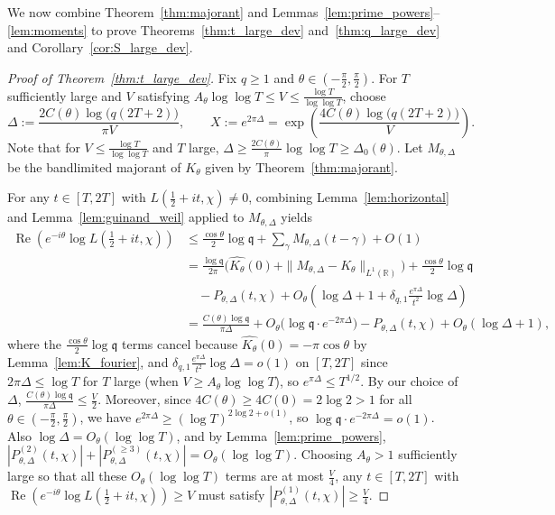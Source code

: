 \documentclass[11pt,a4paper]{amsart}
\theoremstyle{remark}
\numberwithin{equation}{section}
\newcommand{\R}{\mathbb{R}}
\newcommand{\q}{\mathfrak{q}}
\begin{document}
We now combine Theorem~\ref{thm:majorant} and Lemmas~\ref{lem:prime_powers}--\ref{lem:moments} to prove Theorems~\ref{thm:t_large_dev} and~\ref{thm:q_large_dev} and Corollary~\ref{cor:S_large_dev}.

\begin{proof}[Proof of Theorem~\ref{thm:t_large_dev}]
Fix $q \ge 1$ and $\theta \in (-\frac{\pi}{2},\frac{\pi}{2})$. For $T$ sufficiently large and $V$ satisfying $A_\theta\log\log T \le V \le \frac{\log T}{\log\log T}$, choose
\[
  \Delta := \frac{2C(\theta)\log\bigl(q(2T+2)\bigr)}{\pi V},
  \qquad
  X := e^{2\pi\Delta} = \exp\!\left(\frac{4C(\theta)\log\bigl(q(2T+2)\bigr)}{V}\right).
\]
Note that for $V \le \frac{\log T}{\log\log T}$ and $T$ large, $\Delta \ge \frac{2C(\theta)}{\pi}\log\log T \ge \Delta_0(\theta)$. Let $M_{\theta,\Delta}$ be the bandlimited majorant of $K_\theta$ given by Theorem~\ref{thm:majorant}.

For any $t \in [T,2T]$ with $L(\frac{1}{2}+it,\chi) \neq 0$, combining Lemma~\ref{lem:horizontal} and Lemma~\ref{lem:guinand_weil} applied to $M_{\theta,\Delta}$ yields
\begin{align*}
  \operatorname{Re}\!\left(e^{-i\theta}\log L(\tfrac{1}{2}+it,\chi)\right)
  &\le \frac{\cos\theta}{2}\log\q + \sum_\gamma M_{\theta,\Delta}(t-\gamma) + O(1) \\
  &= \frac{\log\q}{2\pi}\bigl(\widehat{K_\theta}(0) + \|M_{\theta,\Delta}-K_\theta\|_{L^1(\R)}\bigr) + \frac{\cos\theta}{2}\log\q \\
  &\quad - P_{\theta,\Delta}(t,\chi) + O_\theta\!\left(\log\Delta + 1 + \delta_{q,1}\frac{e^{\pi\Delta}}{t^2}\log\Delta\right) \\
  &= \frac{C(\theta)\log\q}{\pi\Delta} + O_\theta\bigl(\log\q\cdot e^{-2\pi\Delta}\bigr) - P_{\theta,\Delta}(t,\chi) + O_\theta(\log\Delta + 1),
\end{align*}
where the $\frac{\cos\theta}{2}\log\q$ terms cancel because $\widehat{K_\theta}(0) = -\pi\cos\theta$ by Lemma~\ref{lem:K_fourier}, and $\delta_{q,1}\frac{e^{\pi\Delta}}{t^2}\log\Delta = o(1)$ on $[T,2T]$ since $2\pi\Delta \le \log T$ for $T$ large (when $V \ge A_\theta\log\log T$), so $e^{\pi\Delta} \le T^{1/2}$. By our choice of $\Delta$, $\frac{C(\theta)\log\q}{\pi\Delta} \le \frac{V}{2}$. Moreover, since $4C(\theta) \ge 4C(0) = 2\log 2 > 1$ for all $\theta \in (-\frac{\pi}{2},\frac{\pi}{2})$, we have $e^{2\pi\Delta} \ge (\log T)^{2\log 2 + o(1)}$, so $\log\q\cdot e^{-2\pi\Delta} = o(1)$. Also $\log\Delta = O_\theta(\log\log T)$, and by Lemma~\ref{lem:prime_powers}, $|P_{\theta,\Delta}^{(2)}(t,\chi)| + |P_{\theta,\Delta}^{(\ge 3)}(t,\chi)| = O_\theta(\log\log T)$. Choosing $A_\theta > 1$ sufficiently large so that all these $O_\theta(\log\log T)$ terms are at most $\frac{V}{4}$, any $t \in [T,2T]$ with $\operatorname{Re}(e^{-i\theta}\log L(\frac{1}{2}+it,\chi)) \ge V$ must satisfy $|P_{\theta,\Delta}^{(1)}(t,\chi)| \ge \frac{V}{4}$.


\end{proof}
\end{document}
